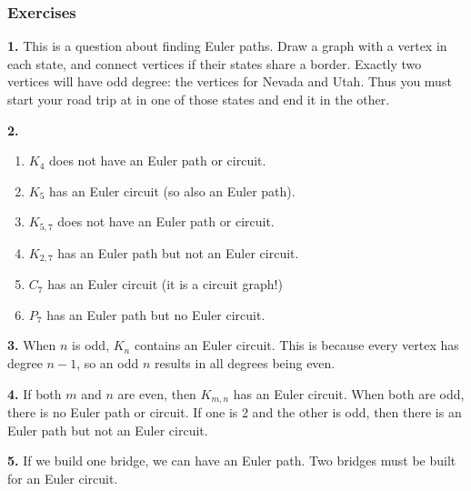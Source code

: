 \documentclass[10pt,]{book}
\theoremstyle{plain}
\theoremstyle{definition}
\theoremstyle{definition}
\theoremstyle{definition}
\numberwithin{equation}{chapter}
\newcommand{\vtx}[2]{node[fill,circle,inner sep=0pt, minimum size=4pt,label=#1:#2]{}}
\renewcommand{\v}{\vtx{above}{}}
\begin{document}
\subsubsection*{ Exercises}
\noindent\textbf{1.}\quad{}
This is a question about finding Euler paths. Draw a graph with a vertex in each state, and connect vertices if their states share a border. Exactly two vertices will have odd degree: the vertices for Nevada and Utah. Thus you must start your road trip at in one of those states and end it in the other.
%
\par\smallskip
\noindent\textbf{2.}\quad{}\leavevmode%
\begin{enumerate}[label=(\alph*)]
\item\hypertarget{li-1227}{}\(K_4\) does not have an Euler path or circuit.%
\item\hypertarget{li-1228}{}\(K_5\) has an Euler circuit (so also an Euler path).%
\item\hypertarget{li-1229}{}\(K_{5,7}\) does not have an Euler path or circuit.%
\item\hypertarget{li-1230}{}\(K_{2,7}\) has an Euler path but not an Euler circuit.%
\item\hypertarget{li-1231}{}\(C_7\) has an Euler circuit (it is a circuit graph!)%
\item\hypertarget{li-1232}{}\(P_7\) has an Euler path but no Euler circuit.%
\end{enumerate}
\par\smallskip
\noindent\textbf{3.}\quad{}
When \(n\) is odd, \(K_n\) contains an Euler circuit. This is because every vertex has degree \(n-1\), so an odd \(n\) results in all degrees being even.
%
\par\smallskip
\noindent\textbf{4.}\quad{}
If both \(m\) and \(n\) are even, then \(K_{m,n}\) has an Euler circuit. When both are odd, there is no Euler path or circuit. If one is 2 and the other is odd, then there is an Euler path but not an Euler circuit.
%
\par\smallskip
\noindent\textbf{5.}\quad{}
If we build one bridge, we can have an Euler path. Two bridges must be built for an Euler circuit.
%
\leavevmode%
\begin{figure}
\centering
{
}
\end{figure}
\end{document}
